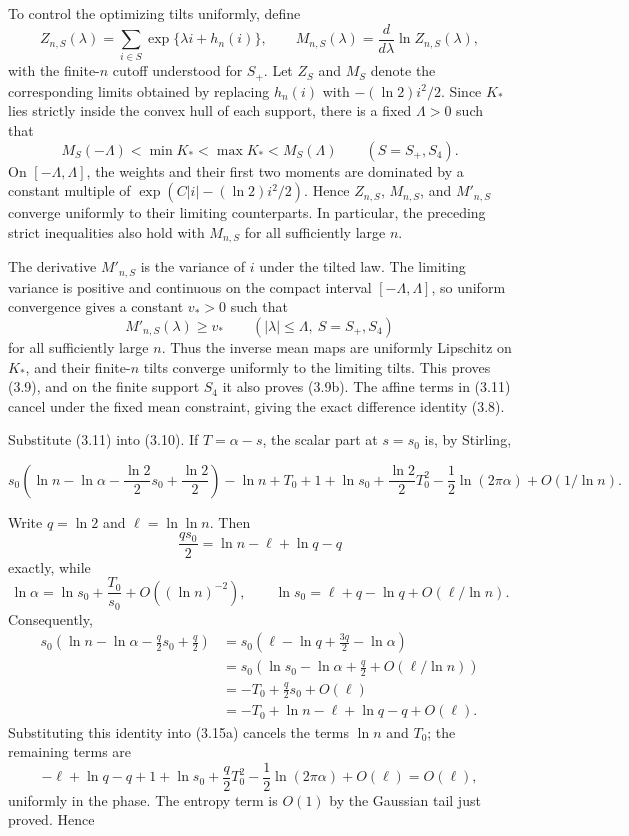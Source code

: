 \documentclass[11pt,reqno]{amsart}
\begin{document}
To control the optimizing tilts uniformly, define
\[
 Z_{n,S}(\lambda)=\sum_{i\in S}
   \exp\{\lambda i+h_n(i)\},\qquad
 M_{n,S}(\lambda)=\frac{d}{d\lambda}\ln Z_{n,S}(\lambda),
\]
with the finite-\(n\) cutoff understood for \(S_+\). Let \(Z_S\) and
\(M_S\) denote the corresponding limits obtained by replacing
\(h_n(i)\) with \(-(\ln 2)i^2/2\). Since \(K_*\) lies strictly inside
the convex hull of each support, there is a fixed \(\Lambda>0\) such that
\[
 M_S(-\Lambda)<\min K_*<\max K_*<M_S(\Lambda)
 \qquad(S=S_+,S_4).
\]
On \([-\Lambda,\Lambda]\), the weights and their first two moments are
dominated by a constant multiple of
\(\exp(C|i|-(\ln 2)i^2/2)\). Hence \(Z_{n,S}\), \(M_{n,S}\), and
\(M'_{n,S}\) converge uniformly to their limiting counterparts. In
particular, the preceding strict inequalities also hold with \(M_{n,S}\)
for all sufficiently large \(n\).

The derivative \(M'_{n,S}\) is the variance of \(i\) under the tilted
law. The limiting variance is positive and continuous on the compact
interval \([-\Lambda,\Lambda]\), so uniform convergence gives a constant
\(v_*>0\) such that
\[
 M'_{n,S}(\lambda)\ge v_*
 \qquad(|\lambda|\le\Lambda,\ S=S_+,S_4)
\]
for all sufficiently large \(n\). Thus the inverse mean maps are
uniformly Lipschitz on \(K_*\), and their finite-\(n\) tilts converge
uniformly to the limiting tilts. This proves (3.9), and on the finite
support \(S_4\) it also proves (3.9b). The affine terms in (3.11) cancel
under the fixed mean constraint, giving the exact difference identity
(3.8).

Substitute (3.11) into (3.10). If \(T=\alpha-s\), the scalar part at
\(s=s_0\) is, by Stirling,

\[
 s_0\left({\ln n}-\ln\alpha-\frac {\ln 2}2s_0+\frac {\ln 2}2\right)-{\ln n}
 +T_0+1+\ln s_0+\frac {\ln 2}2T_0^2
 -\frac12\ln(2\pi\alpha)+O(1/{\ln n}).                        \tag{3.15a}
\]

Write \(q=\ln 2\) and \(\ell=\ln\ln n\). Then
\[
 \frac{qs_0}{2}=\ln n-\ell+\ln q-q
\]
exactly, while
\[
 \ln\alpha=\ln s_0+\frac{T_0}{s_0}+O((\ln n)^{-2}),
 \qquad
 \ln s_0=\ell+q-\ln q+O(\ell/\ln n).
\]
Consequently,
\[
\begin{split}
s_0\left(\ln n-\ln\alpha-\frac q2s_0+\frac q2\right)
&=s_0\left(\ell-\ln q+\frac{3q}{2}-\ln\alpha\right)\\
&=s_0\left(\ln s_0-\ln\alpha+\frac q2
             +O(\ell/\ln n)\right)\\
&=-T_0+\frac q2s_0+O(\ell)\\
&=-T_0+\ln n-\ell+\ln q-q+O(\ell).
\end{split}
\]
Substituting this identity into (3.15a) cancels the terms
\(\ln n\) and \(T_0\); the remaining terms are
\[
 -\ell+\ln q-q+1+\ln s_0+\frac q2T_0^2
 -\frac12\ln(2\pi\alpha)+O(\ell)=O(\ell),
\]
uniformly in the phase.
The entropy term is \(O(1)\) by the Gaussian tail just proved.
Hence
\end{document}
